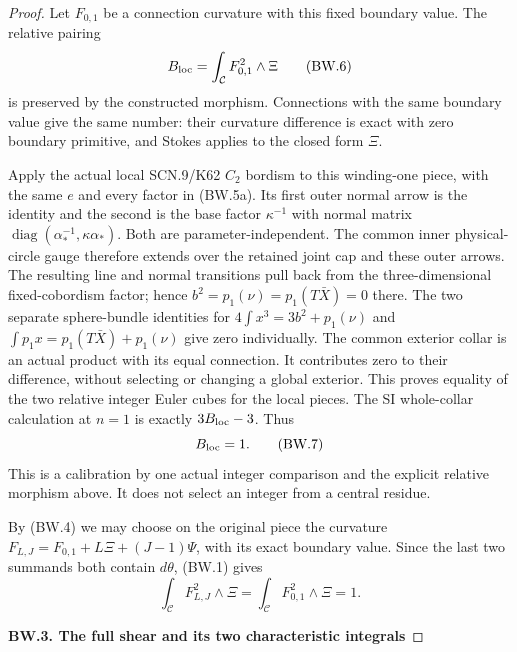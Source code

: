 \begin{proof}
Let \(F_{0,1}\) be a connection curvature with this fixed boundary
value. The relative pairing
\[
 B_{\rm loc}=\int_{\mathcal C}F_{0,1}^{2}\wedge\Xi
                                                        \tag{BW.6}
\]
is preserved by the constructed morphism. Connections with the same
boundary value give the same number: their curvature difference is
exact with zero boundary primitive, and Stokes applies to the closed
form \(\Xi\).

Apply the actual local SCN.9/K62 \(C_2\) bordism to this winding-one
piece, with the same \(e\) and every factor in (BW.5a). Its first
outer normal arrow is the identity and the second is the base
factor \(\kappa^{-1}\) with normal matrix
\(\operatorname{diag}(\alpha_*^{-1},\kappa\alpha_*)\).
Both are parameter-independent. The common inner physical-circle
gauge therefore extends over the retained joint cap and these
outer arrows. The resulting line and normal transitions pull back
from the three-dimensional fixed-cobordism factor; hence
\(b^2=p_1(\nu)=p_1(T\bar X)=0\) there. The two separate sphere-bundle
identities for \(4\int x^3=3b^2+p_1(\nu)\) and
\(\int p_1x=p_1(T\bar X)+p_1(\nu)\) give zero individually.
The common exterior collar is an actual product with its equal
connection. It contributes zero to their difference, without
selecting or changing a global exterior. This proves equality of
the two relative integer Euler cubes for the local pieces.
The SI whole-collar calculation at \(n=1\) is exactly
\(3B_{\rm loc}-3\). Thus
\[
                         B_{\rm loc}=1.               \tag{BW.7}
\]
This is a calibration by one actual integer comparison and the
explicit relative morphism above. It does not select an integer
from a central residue.

By (BW.4) we may choose on the original piece the curvature
\(F_{L,J}=F_{0,1}+L\Xi+(J-1)\Psi\), with its exact boundary value.
Since the last two summands both contain \(d\theta\), (BW.1) gives
\[
 \int_{\mathcal C}F_{L,J}^{2}\wedge\Xi
       =\int_{\mathcal C}F_{0,1}^{2}\wedge\Xi=1.
                                                        \tag{BW.8}
\]

\par

\medskip\noindent\textbf{BW.3. The full shear and its two characteristic integrals}

\par\nobreak


\end{proof}
